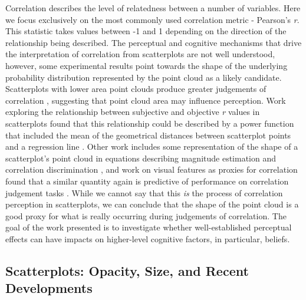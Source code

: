 \documentclass[sigconf]{acmart}
\begin{document}
Correlation describes the level of relatedness between a number of
variables. Here we focus exclusively on the most commonly used
correlation metric - Pearson's \emph{r}. This statistic takes values
between -1 and 1 depending on the direction of the relationship being
described. The perceptual and cognitive mechanisms that drive the
interpretation of correlation from scatterplots are not well understood,
however, some experimental results point towards the shape of the
underlying probability distribution represented by the point cloud as a
likely candidate. Scatterplots with lower area point clouds produce
greater judgements of correlation \citep{cleveland_1982}, suggesting
that point cloud area may influence perception. Work exploring the
relationship between subjective and objective \emph{r} values in
scatterplots found that this relationship could be described by a power
function that included the mean of the geometrical distances between
scatterplot points and a regression line \citep{meyer_1997}. Other work
includes some representation of the shape of a scatterplot's point cloud
in equations describing magnitude estimation and correlation
discrimination \citep{meyer_1997, rensink_2017}, and work on visual
features as proxies for correlation found that a similar quantity again
is predictive of performance on correlation judgement tasks
\citep{yang_2019}. While we cannot say that this \emph{is} the process
of correlation perception in scatterplots, we can conclude that the
shape of the point cloud is a good proxy for what is really occurring
during judgements of correlation. The goal of the work presented is to
investigate whether well-established perceptual effects can have impacts
on higher-level cognitive factors, in particular, beliefs.

\subsection{Scatterplots: Opacity, Size, and Recent
Developments}\label{sec-scatterplots}
\end{document}

